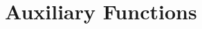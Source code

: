 \documentclass{article}
\theoremstyle{definition}
\begin{document}
\title{}

\maketitle





\section{Auxiliary Functions}

\end{document}
